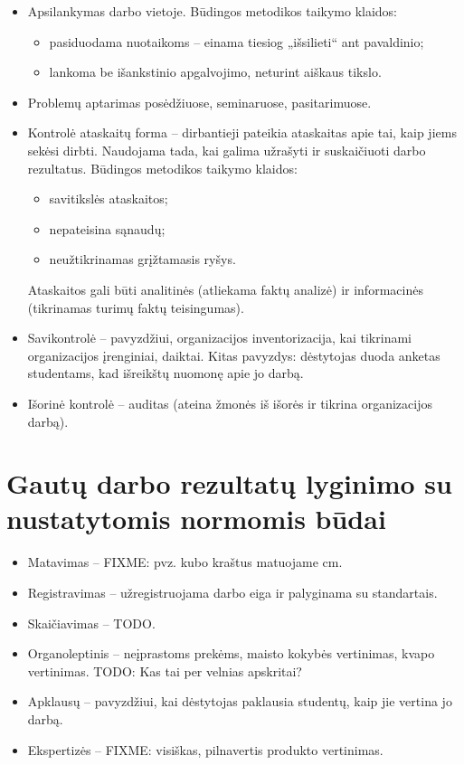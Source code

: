 \begin{itemize}
  \item Apsilankymas darbo vietoje. Būdingos metodikos taikymo
    klaidos:
    \begin{itemize}
      \item pasiduodama nuotaikoms – einama tiesiog „išsilieti“ ant
        pavaldinio;
      \item lankoma be išankstinio apgalvojimo, neturint aiškaus
        tikslo.
    \end{itemize}
  \item Problemų aptarimas posėdžiuose, seminaruose, pasitarimuose.
  \item Kontrolė ataskaitų forma – dirbantieji pateikia ataskaitas
    apie tai, kaip jiems sekėsi dirbti. Naudojama tada, kai galima
    užrašyti ir suskaičiuoti darbo rezultatus. Būdingos metodikos
    taikymo klaidos:
    \begin{itemize}
      \item savitikslės ataskaitos;
      \item nepateisina sąnaudų;
      \item neužtikrinamas grįžtamasis ryšys.
    \end{itemize}
    Ataskaitos gali būti analitinės (atliekama faktų analizė) ir
    informacinės (tikrinamas turimų faktų teisingumas).
  \item Savikontrolė – pavyzdžiui, organizacijos inventorizacija, kai
    tikrinami organizacijos įrenginiai, daiktai. Kitas pavyzdys:
    dėstytojas duoda anketas studentams, kad išreikštų nuomonę apie
    jo darbą.
  \item Išorinė kontrolė – auditas (ateina žmonės iš išorės ir tikrina
    organizacijos darbą).
\end{itemize}

\section{Gautų darbo rezultatų lyginimo su nustatytomis normomis būdai}

\begin{itemize}
  \item Matavimas – FIXME: pvz. kubo kraštus matuojame cm.
  \item Registravimas – užregistruojama darbo eiga ir palyginama su
    standartais.
  \item Skaičiavimas – TODO.
  \item Organoleptinis – neįprastoms prekėms, maisto kokybės vertinimas,
    kvapo vertinimas. TODO: Kas tai per velnias apskritai?
  \item Apklausų – pavyzdžiui, kai dėstytojas paklausia studentų, kaip
    jie vertina jo darbą.
  \item Ekspertizės – FIXME: visiškas, pilnavertis produkto vertinimas.
\end{itemize}

